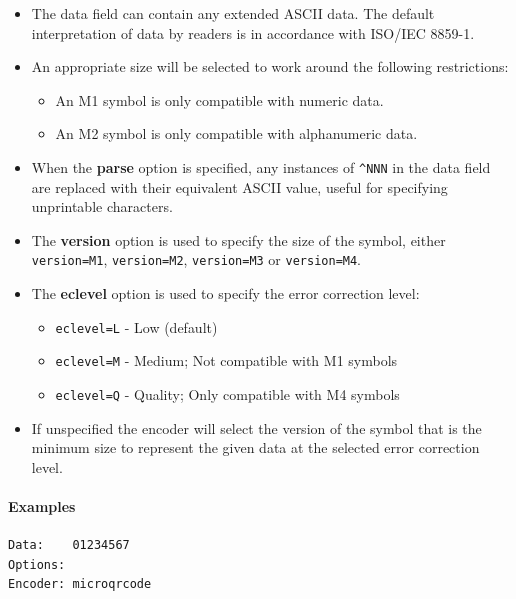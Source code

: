 \begin{itemize}
\tightlist
\item
  The data field can contain any extended ASCII data. The default
  interpretation of data by readers is in accordance with ISO/IEC
  8859-1.
\item
  An appropriate size will be selected to work around the following
  restrictions:

  \begin{itemize}
  \tightlist
  \item
    An M1 symbol is only compatible with numeric data.
  \item
    An M2 symbol is only compatible with alphanumeric data.
  \end{itemize}
\item
  When the \textbf{parse} option is specified, any instances of
  \texttt{\^{}NNN} in the data field are replaced with their equivalent
  ASCII value, useful for specifying unprintable characters.
\item
  The \textbf{version} option is used to specify the size of the symbol,
  either \texttt{version=M1}, \texttt{version=M2}, \texttt{version=M3}
  or \texttt{version=M4}.
\item
  The \textbf{eclevel} option is used to specify the error correction
  level:

  \begin{itemize}
  \tightlist
  \item
    \texttt{eclevel=L} - Low (default)
  \item
    \texttt{eclevel=M} - Medium; Not compatible with M1 symbols
  \item
    \texttt{eclevel=Q} - Quality; Only compatible with M4 symbols
  \end{itemize}
\item
  If unspecified the encoder will select the version of the symbol that
  is the minimum size to represent the given data at the selected error
  correction level.
\end{itemize}

\hypertarget{examples-14}{%
\paragraph{Examples}\label{examples-14}}

\begin{verbatim}
Data:    01234567
Options: 
Encoder: microqrcode
\end{verbatim}

